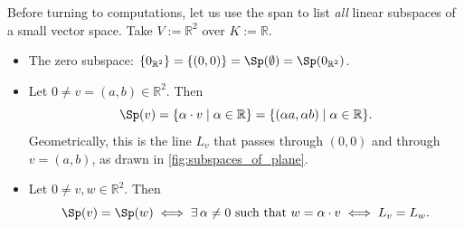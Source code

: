 Before turning to computations, let us use the span to list \emph{all} linear subspaces of a small vector space. Take $V := \mathbb{R}^2$ over $K := \mathbb{R}$.

\begin{example}
\label{ex:lines_through_origin}
\begin{itemize}
    \item The zero subspace: $\{0_{\mathbb{R}^2}\} = \{(0,0)\} = \Sp(\emptyset) = \Sp(0_{\mathbb{R}^2})$.
    \item Let $0 \ne v = (a,b) \in \mathbb{R}^2$. Then
    \[
    \Sp(v) = \{\alpha \cdot v \mid \alpha \in \mathbb{R}\} = \{(\alpha a, \alpha b) \mid \alpha \in \mathbb{R}\}.
    \]
    Geometrically, this is the line $L_v$ that passes through $(0,0)$ and through $v = (a,b)$, as drawn in \cref{fig:subspaces_of_plane}.
    \item Let $0 \ne v, w \in \mathbb{R}^2$. Then
    \[
    \Sp(v) = \Sp(w)
    \iff \exists \, \alpha \ne 0 \text{ such that } w = \alpha \cdot v
    \iff L_v = L_w.
    \]
\end{itemize}
\end{example}

